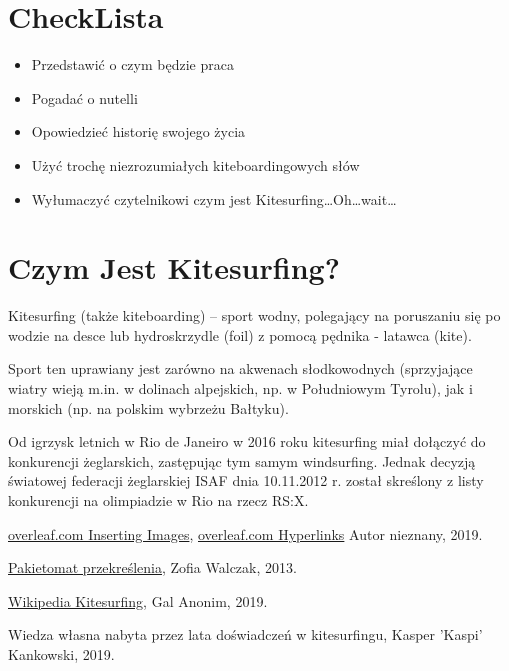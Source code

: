 \documentclass{article}
\begin{document}
	\section{CheckLista}
	
	\begin{itemize}
	\item \makebox[1.5cm]{}Przedstawić o czym będzie praca \CheckedBox
	\item \makebox[1.5cm]{}Pogadać o nutelli \CheckedBox
	\item \makebox[1.5cm]{}Opowiedzieć historię swojego życia \CheckedBox
	\item \makebox[1.5cm]{}Użyć trochę niezrozumiałych kiteboardingowych słów \CheckedBox
	\item \makebox[1.5cm]{}Wyłumaczyć czytelnikowi czym jest Kitesurfing\dots \space Oh\dots \space wait\dots
	\end{itemize}
	
	\section{Czym Jest Kitesurfing?}
	Kitesurfing (także kiteboarding) – sport wodny, polegający na poruszaniu się po wodzie na desce lub hydroskrzydle (foil) z pomocą pędnika - latawca (kite).

Sport ten uprawiany jest zarówno na akwenach słodkowodnych (sprzyjające wiatry wieją m.in. w dolinach alpejskich, np. w Południowym Tyrolu), jak i morskich (np. na polskim wybrzeżu Bałtyku).

Od igrzysk letnich w Rio de Janeiro w 2016 roku kitesurfing miał dołączyć do konkurencji żeglarskich, zastępując tym samym windsurfing. Jednak decyzją światowej federacji żeglarskiej ISAF dnia 10.11.2012 r. został skreślony z listy konkurencji na olimpiadzie w Rio na rzecz RS:X.
	
	\listoffigures
	\listoftables

	
	\begin{thebibliography}{9}
		\href{https://www.overleaf.com/learn/latex/Inserting_Images}{overleaf.com Inserting Images}, \href{https://www.overleaf.com/learn/latex/Hyperlinks}{overleaf.com Hyperlinks} Autor nieznany, 2019.
		
		\href{https://pakietomat.wordpress.com/tag/przekreslenia/}{Pakietomat przekreślenia}, Zofia Walczak, 2013.
		
		\href{https://pl.wikipedia.org/wiki/Kitesurfing}{Wikipedia Kitesurfing}, Gal Anonim, 2019.
		
		Wiedza własna nabyta przez lata doświadczeń w kitesurfingu, Kasper 'Kaspi' Kankowski, 2019.
		
		
		
	\end{thebibliography} 
\end{document}
